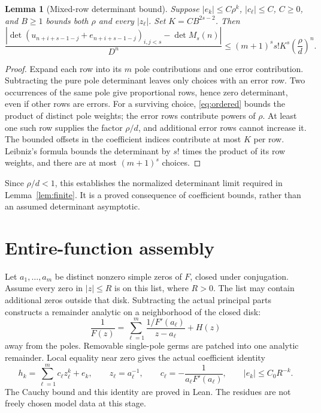 \documentclass[11pt]{amsart}
\newtheorem{lemma}[theorem]{Lemma}
\begin{document}
\begin{lemma}[Mixed-row determinant bound]\label{lem:mixed}
Suppose $|e_k|\le C\rho^k$, $|c_\ell|\le C$, $C\ge0$, and
$B\ge1$ bounds both $\rho$ and every $|z_\ell|$. Set
$K=CB^{2s-2}$. Then
\[
 \frac{\left|\det(u_{n+i+s-1-j}+e_{n+i+s-1-j})_{i,j<s}
                   -\det M_s(n)\right|}{D^n}
 \le (m+1)^s s!K^s\left(\frac{\rho}{d}\right)^n.
\]
\end{lemma}

\begin{proof}
Expand each row into its $m$ pole contributions and one error contribution. Subtracting the pure pole determinant leaves only choices with an error row. Two occurrences of the same pole give proportional rows, hence zero determinant, even if other rows are errors. For a surviving choice, \eqref{eq:ordered} bounds the product of distinct pole weights; the error rows contribute powers of $\rho$. At least one such row supplies the factor $\rho/d$, and additional error rows cannot increase it. The bounded offsets in the coefficient indices contribute at most $K$ per row. Leibniz's formula bounds the determinant by $s!$ times the product of its row weights, and there are at most $(m+1)^s$ choices.
\end{proof}

Since $\rho/d<1$, this establishes the normalized determinant limit required in Lemma~\ref{lem:finite}. It is a proved consequence of coefficient bounds, rather than an assumed determinant asymptotic.

\section{Entire-function assembly}
Let $a_1,\ldots,a_m$ be distinct nonzero simple zeros of $F$, closed under conjugation. Assume every zero in $|z|\le R$ is on this list, where $R>0$. The list may contain additional zeros outside that disk. Subtracting the actual principal parts constructs a remainder analytic on a neighborhood of the closed disk:
\[
 \frac1{F(z)}
   =\sum_{\ell=1}^m\frac{1/F'(a_\ell)}{z-a_\ell}+H(z)
\]
away from the poles. Removable single-pole germs are patched into one analytic remainder. Local equality near zero gives the actual coefficient identity
\[
 h_k=\sum_{\ell=1}^m c_\ell z_\ell^k+e_k,\qquad
 z_\ell=a_\ell^{-1},\qquad
 c_\ell=-\frac1{a_\ell F'(a_\ell)},\qquad
 |e_k|\le C_0R^{-k}.
\]
The Cauchy bound and this identity are proved in Lean. The residues are not freely chosen model data at this stage.
\end{document}
